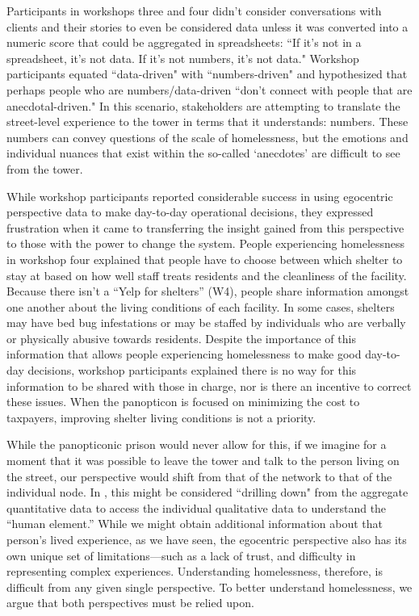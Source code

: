 Participants in workshops three and four didn't consider conversations with clients and their stories to even be considered data unless it was converted into a numeric score that could be aggregated in spreadsheets: ``If it's not in a spreadsheet, it's not data. If it's not numbers, it's not data." Workshop participants equated ``data-driven" with ``numbers-driven" and hypothesized that perhaps people who are numbers/data-driven ``don't connect with people that are anecdotal-driven." In this scenario, stakeholders are attempting to translate the street-level experience to the tower in terms that it understands: numbers. These numbers can convey questions of the scale of homelessness, but the emotions and individual nuances that exist within the so-called `anecdotes' are difficult to see from the tower.

While workshop participants reported considerable success in using egocentric perspective data to make day-to-day operational decisions, they expressed frustration when it came to transferring the insight gained from this perspective to those with the power to change the system. People experiencing homelessness in workshop four explained that people have to choose between which shelter to stay at based on how well staff treats residents and the cleanliness of the facility. Because there isn't a ``Yelp for shelters'' (W4), people share information amongst one another about the living conditions of each facility. In some cases, shelters may have bed bug infestations or may be staffed by individuals who are verbally or physically abusive towards residents. Despite the importance of this information that allows people experiencing homelessness to make good day-to-day decisions, workshop participants explained there is no way for this information to be shared with those in charge, nor is there an incentive to correct these issues. When the panopticon is focused on minimizing the cost to taxpayers, improving shelter living conditions is not a priority.

While the panopticonic prison would never allow for this, if we imagine for a moment that it was possible to leave the tower and talk to the person living on the street, our perspective would shift from that of the network to that of the individual node. In \citet{Verma2016DrillDown}, this might be considered ``drilling down" from the aggregate quantitative data to access the individual qualitative data to understand the ``human element.'' While we might obtain additional information about that person's lived experience, as we have seen, the egocentric perspective also has its own unique set of limitations---such as a lack of trust, and difficulty in representing complex experiences. Understanding homelessness, therefore, is difficult from any given single perspective. To better understand homelessness, we argue that both perspectives must be relied upon.

